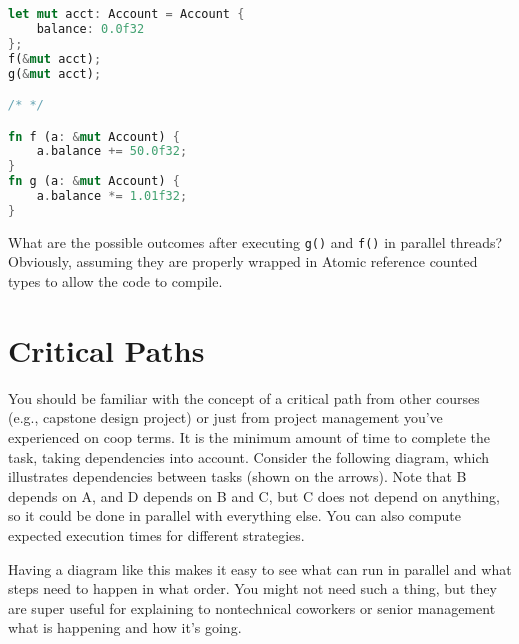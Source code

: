 {\small \begin{lstlisting}[language=Rust]
let mut acct: Account = Account {
    balance: 0.0f32
};
f(&mut acct);
g(&mut acct);

/* */

fn f (a: &mut Account) {
    a.balance += 50.0f32;
}
fn g (a: &mut Account) {
    a.balance *= 1.01f32;
}
\end{lstlisting} }

{\sf What are the possible outcomes after executing {\tt g()} and {\tt f()}
in parallel threads? Obviously, assuming they are properly wrapped in Atomic reference counted types to allow the code to compile.} \\[1em]


\section*{Critical Paths}
You should be familiar with the concept of a critical path from other courses (e.g., capstone design project) or just from project management you've experienced on coop terms. 
It is the minimum amount of time to complete the task, taking dependencies into account.
Consider the following diagram, which illustrates dependencies between
tasks (shown on the arrows). 
Note that B depends on A, and D depends on B and C, but C does
not depend on anything, so it could be done in parallel with
everything else. You can also compute expected execution times
for different strategies.
\begin{center}
\end{center}

 Having a diagram like this makes it easy to see what can run in parallel and what steps need to happen in what order.  You might not need such a thing, but they are super useful for explaining to nontechnical coworkers or senior management what is happening and how it's going.


